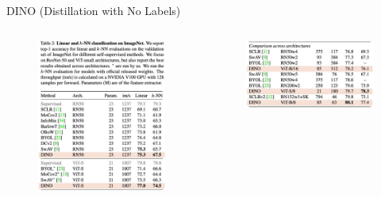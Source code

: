 \begin{frame}[allowframebreaks]{DINO (Distillation with No Labels)}
\framebreak

\begin{columns}[b]
        \begin{figure}
            \centering
            \includegraphics[width=\linewidth,height=0.9\textheight,keepaspectratio]{images/contrastive/slide_89_1_img.png}
        \end{figure}
        \begin{figure}
            \centering
            \includegraphics[width=\linewidth,height=0.9\textheight,keepaspectratio]{images/contrastive/slide_89_2_img.png}
        \end{figure}
\end{columns}


\end{frame}
